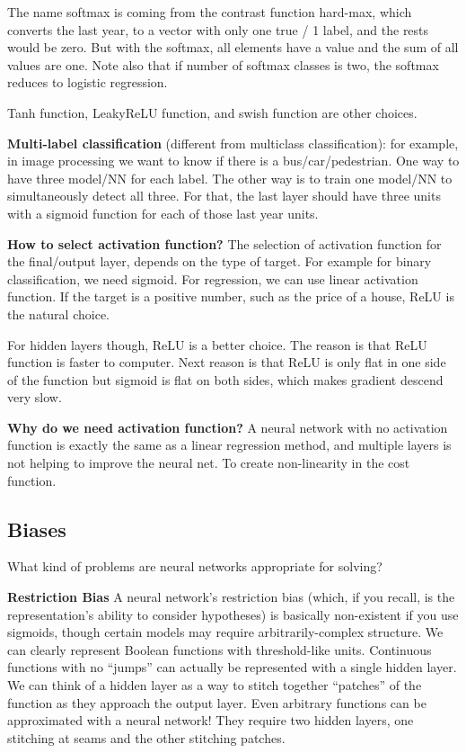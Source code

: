 \documentclass[12pt]{report}
\begin{document}
The name softmax is coming from the contrast function hard-max, which converts the last year, to a vector with only one true / 1 label, and the rests would be zero. But with the softmax, all elements have a value and the sum of all values are one. Note also that if number of softmax classes is two, the softmax reduces to logistic regression.


Tanh function, LeakyReLU function, and swish function are other choices.


\textbf{Multi-label classification} (different from multiclass classification): for example, in image processing we want to know if there is a bus/car/pedestrian. One way to have three model/NN for each label. The other way is to train one model/NN to simultaneously detect all three. For that, the last layer should have three units with a sigmoid function for each of those last year units.


\textbf{How to select activation function?}
The selection of activation function for the final/output layer, depends on the type of target. For example for binary classification, we need sigmoid. For regression, we can use linear activation function. If the target is a positive number, such as the price of a house, ReLU is the natural choice.

For hidden layers though, ReLU is a better choice. The reason is that ReLU function is faster to computer. Next reason is that ReLU is only flat in one side of the function but sigmoid is flat on both sides, which makes gradient descend very slow.



\textbf{Why do we need activation function?}
A neural network with no activation function is exactly the same as a linear regression method, and multiple layers is not helping to improve the neural net.  To create non-linearity in the cost function.

\subsection{Biases}

What kind of problems are neural networks appropriate for solving?

\textbf{Restriction Bias} A neural network’s restriction bias (which, if you recall, is the representation’s ability to consider hypotheses) is basically non-existent if you use sigmoids, though certain models may require arbitrarily-complex structure. We can clearly represent Boolean functions with threshold-like units. Continuous functions with no “jumps” can actually be represented with a single hidden layer. We can think of a hidden layer as a way to stitch together “patches” of the function as they approach the output layer. Even arbitrary functions can be approximated with a neural network! They require two hidden layers, one stitching at seams and the other stitching patches.
\end{document}

